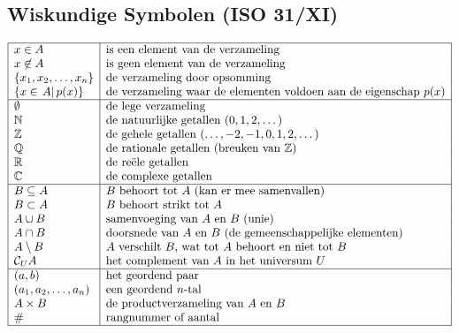 \documentclass[a5paper]{article}
\begin{document}
{\subsection{Wiskundige Symbolen (ISO 31/XI)}
$
\begin{array}{|l|l|}
\hline
x \in A & \text{is een element van de verzameling} \\
x \not\in A & \text{is geen element van de verzameling} \\
\{x_1, x_2, \dots, x_n\} & \text{de verzameling door opsomming} \\
\{ x \in \left. A \right|p(x)\} & \text{de verzameling waar de elementen voldoen aan de eigenschap } p(x) \\
\hline
\emptyset & \text{de lege verzameling} \\
\mathbb{N} & \text{de natuurlijke getallen } (0,1,2,\dots) \\
\mathbb{Z} & \text{de gehele getallen } (\dots, -2,-1,0,1,2,\dots) \\
\mathbb{Q} & \text{de rationale getallen (breuken van } \mathbb{Z} \text{)} \\
\mathbb{R} & \text{de reële getallen} \\
\mathbb{C} & \text{de complexe getallen} \\
\hline
B \subseteq A & B \text{ behoort tot } A \text{ (kan er mee samenvallen)} \\
B \subset A & B \text{ behoort strikt tot } A \\
A \cup B & \text{samenvoeging van } A \text{ en } B \text{ (unie)} \\
A \cap B & \text{doorsnede van } A \text{ en } B \text{ (de gemeenschappelijke elementen)} \\
A \setminus B & A \text{ verschilt } B \text{, wat tot } A \text{ behoort en niet tot } B \\
\mathcal{C}_U A & \text{het complement van } A \text{ in het universum } U \\
\hline
(a,b) & \text{het geordend paar} \\
(a_1, a_2, \dots, a_n) & \text{een geordend } n \text{-tal} \\
A \times B & \text{de productverzameling van } A \text{ en } B \\
\# & \text{rangnummer of aantal} \\
\hline
\end{array}
$
}
\end{document}
